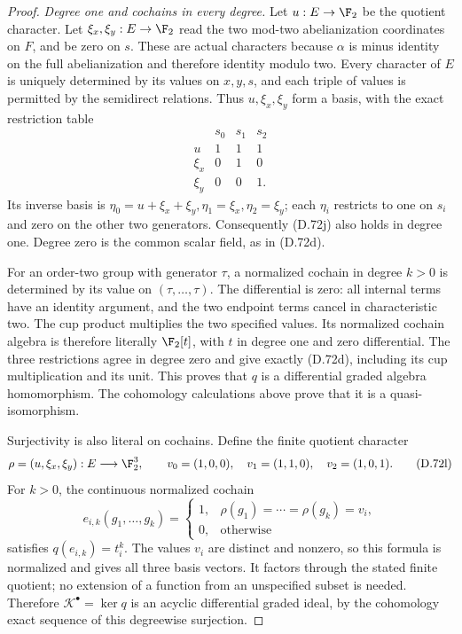 \begin{proof}
\emph{Degree one and cochains in every degree.}
Let $u:E\to\F_2$ be the quotient character. Let
$\xi_x,\xi_y:E\to\F_2$ read the two mod-two
abelianization coordinates on $F$, and be zero on $s$.
These are actual characters because $\alpha$ is
minus identity on the full abelianization and therefore
identity modulo two. Every character of $E$ is
uniquely determined by its values on $x,y,s$, and
each triple of values is permitted by the semidirect
relations. Thus $u,\xi_x,\xi_y$ form a basis, with
the exact restriction table
\[
 \begin{array}{c|ccc}
       &s_0&s_1&s_2\\ \hline
 u     &1&1&1\\
 \xi_x &0&1&0\\
 \xi_y &0&0&1.
 \end{array}                                                   \tag{D.72k}
\]
Its inverse basis is
$\eta_0=u+\xi_x+\xi_y,\eta_1=\xi_x,\eta_2=\xi_y$;
each $\eta_i$ restricts to one on $s_i$ and zero
on the other two generators. Consequently (D.72j)
also holds in degree one. Degree zero is the common
scalar field, as in (D.72d).

For an order-two group with generator $\tau$, a
normalized cochain in degree $k>0$ is determined by
its value on $(\tau,\ldots,\tau)$. The differential
is zero: all internal terms have an identity argument,
and the two endpoint terms cancel in characteristic
two. The cup product multiplies the two specified
values. Its normalized cochain algebra is therefore
literally $\F_2[t]$, with $t$ in degree one and zero
differential. The three restrictions agree in degree
zero and give exactly (D.72d), including its cup
multiplication and its unit. This proves that $q$
is a differential graded algebra homomorphism.
The cohomology calculations above prove that it is
a quasi-isomorphism.

Surjectivity is also literal on cochains. Define the
finite quotient character
\[
 \rho=(u,\xi_x,\xi_y):E\longrightarrow\F_2^3,
 \qquad
 v_0=(1,0,0),\quad v_1=(1,1,0),\quad v_2=(1,0,1).
                                                               \tag{D.72l}
\]
For $k>0$, the continuous normalized cochain
\[
 e_{i,k}(g_1,\ldots,g_k)=
   \begin{cases}
       1,&\rho(g_1)=\cdots=\rho(g_k)=v_i,\\
       0,&\text{otherwise}
   \end{cases}
                                                               \tag{D.72m}
\]
satisfies $q(e_{i,k})=t_i^k$. The values $v_i$
are distinct and nonzero, so this formula is
normalized and gives all three basis vectors.
It factors through the stated finite quotient;
no extension of a function from an unspecified
subset is needed. Therefore
$\mathcal K^\bullet=\ker q$ is an acyclic differential
graded ideal, by the cohomology exact sequence of
this degreewise surjection.


\end{proof}
